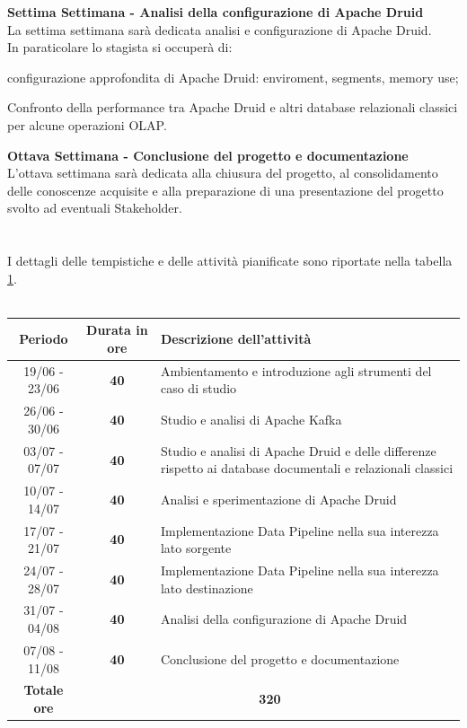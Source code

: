 \noindent \textbf{Settima Settimana - Analisi della configurazione di Apache Druid}\\
La settima settimana sarà dedicata analisi e configurazione di Apache Druid. \\
In paraticolare lo stagista si occuperà di:
\begin{list}{*}{}
    \item configurazione approfondita di Apache Druid: enviroment, segments, memory use;
    \item Confronto della performance tra Apache Druid e altri database relazionali classici per alcune operazioni
    OLAP.
\end{list}
\textbf{Ottava Settimana - Conclusione del progetto e documentazione}\\
L'ottava settimana sarà dedicata alla chiusura del progetto, al consolidamento delle conoscenze acquisite e alla preparazione 
di una presentazione del progetto svolto ad eventuali Stakeholder. \\
\\
\\
I dettagli delle tempistiche e delle attività pianificate sono riportate nella tabella \ref{tab:Tabella3}.\\\\
\begin{table}[h]
    \label{tab:Tabella3}
\begin{tabularx}{\textwidth}{|c|c|X|}
	\hline
	\textbf{Periodo} & \textbf{Durata in ore} & \textbf{Descrizione dell'attività} \\\hline
	19/06 - 23/06 & \textbf{40} & Ambientamento e introduzione agli strumenti del caso di studio \\ \hline
    26/06 - 30/06 & \textbf{40} & Studio e analisi di Apache Kafka \\ \hline
    03/07 - 07/07 & \textbf{40} & Studio e analisi di Apache Druid e delle differenze rispetto ai database documentali e relazionali classici  \\ \hline
    10/07 - 14/07 & \textbf{40} & Analisi e sperimentazione di Apache Druid \\ \hline
    17/07 - 21/07 & \textbf{40} & Implementazione \gls{Data Pipeline}{} nella sua interezza lato sorgente \\ \hline
    24/07 - 28/07 & \textbf{40} & Implementazione \gls{Data Pipeline}{} nella sua interezza lato destinazione \\ \hline
    31/07 - 04/08 & \textbf{40} & Analisi della configurazione di Apache Druid \\ \hline
	07/08 - 11/08 & \textbf{40} & Conclusione del progetto e documentazione \\\hline
	\textbf{Totale ore} & \multicolumn{2}{|c|}{\textbf{320}} \\\hline
\end{tabularx}
\end{table}
\pagebreak
